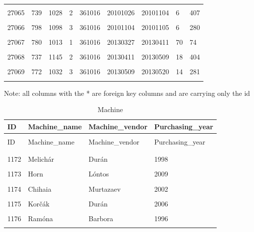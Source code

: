 \documentclass[letterpaper,12pt]{article}
\begin{document}
\begin{longtable}{p{1cm}p{1.5cm}p{1.5cm}p{1cm}p{1.5cm}p{1.8cm}p{1.6cm}p{1.3cm}p{2.2cm}}
        \hline \\
        27065 & 739 & 1028 & 2 & \color{red} 361016 & 20101026 & 20101104 & \color{red} 6 & 407 \\
        \hline \\
        27066 & 798 & 1098 & 3 & \color{red} 361016 & 20101104 & 20101105 & \color{red} 6 & 280 \\
        \hline \\
        27067 & 780 & 1013 & 1 & \color{red} 361016 & 20130327 & 20130411 & \color{red} 70 & 74 \\
        \hline \\
        27068 & 737 & 1145 & 2 & \color{red} 361016 & 20130411 & 20130509 & \color{red} 18 & 404 \\
        \hline \\
        27069 & 772 & 1032 & 3 & \color{red} 361016 & 20130509 & 20130520 & \color{red} 14 & 281 \\
        \hline \\
\end{longtable} 
\endgroup

Note: all columns with the * are foreign key columns and are carrying only the id

\begingroup
\renewcommand\arraystretch{0.5}
\begin{longtable}{p{1cm}p{3cm}p{3.2cm}p{3.1cm}}
        \caption{Machine} \\
        ID & Machine\_name & Machine\_vendor & Purchasing\_year \\
        \endfirsthead \\
        ID & Machine\_name & Machine\_vendor & Purchasing\_year \\
        \endhead \\
        \hline \\
        1172 & Melichár & Durán & 1998 \\
        \hline \\
        1173 & Horn & Lóntos & 2009 \\
        \hline \\
        1174 & Chihaia & Murtazaev & 2002 \\
        \hline \\
        1175 & Korčák & Durán & 2006 \\
        \hline \\
        \color{red} 1176 & \color{red} Ramóna & Barbora & 1996 \\
        \hline \\
\end{longtable} 
\endgroup
\end{document}
